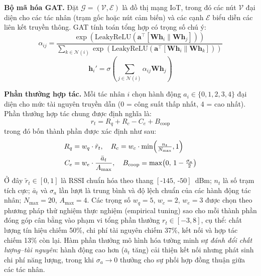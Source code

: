 \documentclass[conference]{IEEEtran}
\begin{document}
\textbf{Bộ mã hóa GAT.} Đặt $\mathcal{G} = (\mathcal{V}, \mathcal{E})$
là đồ thị mạng IoT, trong đó các nút $\mathcal{V}$ đại diện cho
các tác nhân (trạm gốc hoặc nút cảm biến) và các cạnh $\mathcal{E}$
biểu diễn các liên kết truyền thông. GAT tính toán tổng hợp có
trọng số chú ý:
\begin{equation}
  \alpha_{ij} = \frac{\exp(\text{LeakyReLU}(\mathbf{a}^\top
  [\mathbf{W}\mathbf{h}_i \| \mathbf{W}\mathbf{h}_j]))}
  {\sum_{k \in \mathcal{N}(i)} \exp(\text{LeakyReLU}(\mathbf{a}^\top
  [\mathbf{W}\mathbf{h}_i \| \mathbf{W}\mathbf{h}_k]))}
  \label{eq:gat_attn}
\end{equation}
\begin{equation}
  \mathbf{h}_i' = \sigma\!\left(\sum_{j \in \mathcal{N}(i)}
  \alpha_{ij} \mathbf{W}\mathbf{h}_j\right)
  \label{eq:gat_agg}
\end{equation}

\textbf{Phần thưởng hợp tác.} Mỗi tác nhân $i$ chọn hành động
$a_i \in \{0,1,2,3,4\}$ đại diện cho mức tài nguyên truyền dẫn
(0 = công suất thấp nhất, 4 = cao nhất).
Phần thưởng hợp tác chung được định nghĩa là:
\begin{equation}
  r_t = R_q + R_c - C_e + B_{\text{coop}}
  \label{eq:reward}
\end{equation}
trong đó bốn thành phần được xác định như sau:
\begin{align}
  R_q &= w_q \cdot \tilde{r}_t, \quad
  R_c = w_c \cdot \min\!\left(\tfrac{n_t}{N_{\max}}, 1\right) \notag \\
  C_e &= w_e \cdot \frac{\bar{a}_t}{A_{\max}}, \quad
  B_{\text{coop}} = \max\!\left(0,\, 1 - \tfrac{\sigma_a}{2}\right)
  \label{eq:reward_components}
\end{align}
Ở đây $\tilde{r}_t \in [0,1]$ là RSSI chuẩn hóa theo thang
$[\text{-145, -50}]$~dBm; $n_t$ là số trạm tích cực; $\bar{a}_t$
và $\sigma_a$ lần lượt là trung bình và độ lệch chuẩn của các
hành động tác nhân; $N_{\max} = 20$, $A_{\max} = 4$.
Các trọng số $w_q = 5$, $w_c = 2$, $w_e = 3$ được chọn theo
phương pháp thử nghiệm thực nghiệm (empirical tuning) sao cho
mỗi thành phần đóng góp cân bằng vào phạm vi tổng phần thưởng
$r_t \in [-3, 8]$, cụ thể: chất lượng tín hiệu chiếm 50\%,
chi phí tài nguyên chiếm 37\%, kết nối và hợp tác chiếm 13\%
còn lại. Hàm phần thưởng mô hình hóa tường minh sự \emph{đánh đổi chất lượng--tài nguyên}: hành động cao hơn
($\bar{a}_t$ tăng) cải thiện kết nối nhưng phát sinh chi phí
năng lượng, trong khi $\sigma_a \to 0$ thưởng cho sự phối hợp
đồng thuận giữa các tác nhân.
\end{document}
